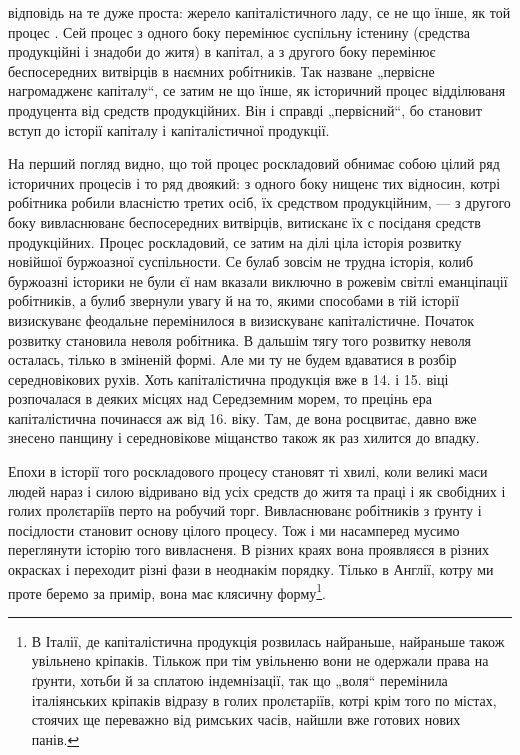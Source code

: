 \parcont{}
відповідь на те дуже проста: жерело капіталістичного ладу,
се не що їнше, як той процес .
Сей процес з одного боку перемінює суспільну істенину
(средства продукційні і знадоби до житя) в капітал, а з другого
боку перемінює беспосередних витвірців в наємних
робітників. Так назване „первісне нагромадженє капіталу“,
се затим не що їнше, як історичний процес відділюваня
продуцента від средств продукційних. Він і справді „первісний“,
бо становит вступ до історії капіталу і капіталістичної
продукції.

На перший погляд видно, що той процес роскладовий
обнимає собою цілий ряд історичних процесів і то ряд двоякий:
з одного боку нищенє тих відносин, котрі робітника
робили власністю третих осіб, їх средством продукційним,
— з другого боку вивласнюванє беспосередних витвірців,
витисканє їх с посіданя средств продукційних. Процес роскладовий,
се затим на ділі ціла історія розвитку новійшої
буржоазної суспільности. Се булаб зовсім не трудна історія,
колиб буржоазні історики не були єї нам вказали виключно
в рожевім світлі еманціпації робітників, а булиб звернули
увагу й на то, якими способами в тій історії визискуванє
феодальне перемінилося в визискуванє капіталістичне. Початок
розвитку становила неволя робітника. В дальшім тягу
того розвитку неволя осталась, тілько в зміненій формі.
Але ми ту не будем вдаватися в розбір середновікових рухів.
Хоть капіталістична продукція вже в 14. і 15. віці розпочалася
в деяких місцях над Середземним морем, то прецінь
ера капіталістична починаєся аж від 16. віку. Там,
де вона росцвитає, давно вже знесено панщину і середновікове
міщанство також як раз хилится до впадку.

Епохи в історії того роскладового процесу становят ті
хвилі, коли великі маси людей нараз і силою відривано від
усіх средств до житя та праці і як свобідних і голих пролєтаріїв
перто на робучий торг. Вивласнюванє робітників
з ґрунту і посідлости становит основу цілого процесу. Тож
і ми насамперед мусимо переглянути історію того вивласненя.
В різних краях вона проявляєся в різних окрасках
і переходит різні фази в неоднакім порядку. Тілько в Англії,
котру ми проте беремо за примір, вона має клясичну форму\footnote{
В Італії, де капіталістична продукція розвилась найраньше, найраньше
також увільнено кріпаків. Тількож при тім увільненю вони не
одержали права на ґрунти, хотьби й за сплатою індемнізації, так що
„воля“ перемінила італіянських кріпаків відразу в голих пролєтаріїв, котрі
крім того по містах, стоячих ще переважно від римських часів, найшли
вже готових нових панів.
}.
